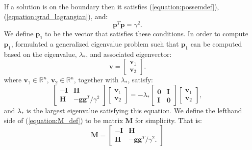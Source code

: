\documentclass[letterpaper,12pt,titlepage,oneside,final]{book}
\begin{document}
	If a solution is on the boundary then it satisfies (\ref{equation:possemdef}), (\ref{equation:grad_lagrangian}), and:
	\begin{equation}
	\mathbf{p}^{T}\mathbf{p} = \gamma^{2}.
	\label{equation:boundary}
	\end{equation}
	We define $\mathbf{p}_{1}$ to be the vector that satisfies these conditions. In order to compute $\mathbf{p}_{1}$, \cite{adachi.paper} formulated a generalized eigenvalue problem such that $\mathbf{p}_{1}$ can be computed based on the eigenvalue, $\lambda_{*}$, and associated eigenvector:
	\begin{equation}
	\mathbf{v} = \begin{bmatrix}\mathbf{v}_{1} \\ \mathbf{v}_{2} \end{bmatrix}.
	\end{equation}
	where $\mathbf{v}_{1} \in \mathbb{R}^{n}$, $\mathbf{v}_{2} \in \mathbb{R}^{n}$, together with $\lambda_{*}$, satisfy:
	\begin{equation}
	\begin{bmatrix}
	-\mathbf{I} & \mathbf{H} \\
	\mathbf{H} & -\mathbf{gg}^{T}/\gamma^{2}
	\end{bmatrix}
	\begin{bmatrix}
	\mathbf{v}_{1} \\
	\mathbf{v}_{2} 
	\end{bmatrix}
	= -\lambda_{*}
	\begin{bmatrix}
	\mathbf{0} & \mathbf{I} \\
	\mathbf{I} & \mathbf{0}
	\end{bmatrix}
	\begin{bmatrix}
	\mathbf{v}_{1} \\
	\mathbf{v}_{2} 
	\end{bmatrix},
	\label{equation:M_def}
	\end{equation}
	and $\lambda_{*}$ is the largest eigenvalue satisfying this equation. We define the lefthand side of (\ref{equation:M_def}) to be matrix $\mathbf{M}$ for simplicity. That is:
	\begin{equation}
	\mathbf{M} = 
	\begin{bmatrix}
	-\mathbf{I} & \mathbf{H} \\
	\mathbf{H} & -\mathbf{gg}^{T}/\gamma^{2}.
	\end{bmatrix}
	\label{equation:M}
	\end{equation}
		
\end{document}
